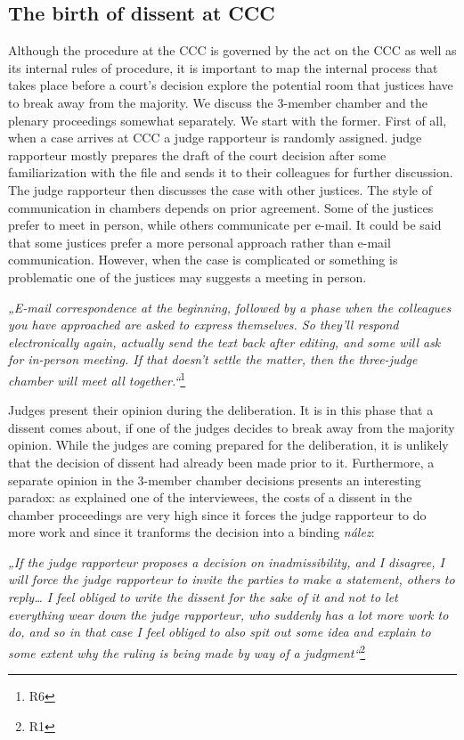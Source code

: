 \documentclass[
  11pt,
]{article}
\begin{document}
\subsection{The birth of dissent at CCC}\label{birth}

Although the procedure at the CCC is governed by the act on the CCC as well as its internal rules of procedure, it is important to map the internal process that takes place before a court's decision explore the potential room that justices have to break away from the majority. We discuss the 3-member chamber and the plenary proceedings somewhat separately. We start with the former. First of all, when a case arrives at CCC a judge rapporteur is randomly assigned. judge rapporteur mostly prepares the draft of the court decision after some familiarization with the file and sends it to their colleagues for further discussion. The judge rapporteur then discusses the case with other justices. The style of communication in chambers depends on prior agreement. Some of the justices prefer to meet in person, while others communicate per e-mail. It could be said that some justices prefer a more personal approach rather than e-mail communication. However, when the case is complicated or something is problematic one of the justices may suggests a meeting in person.

\emph{„E-mail correspondence at the beginning, followed by a phase when the colleagues you have approached are asked to express themselves. So they'll respond electronically again, actually send the text back after editing, and some will ask for in-person meeting. If that doesn't settle the matter, then the three-judge chamber will meet all together.``}\footnote{R6}

Judges present their opinion during the deliberation. It is in this phase that a dissent comes about, if one of the judges decides to break away from the majority opinion. While the judges are coming prepared for the deliberation, it is unlikely that the decision of dissent had already been made prior to it. Furthermore, a separate opinion in the 3-member chamber decisions presents an interesting paradox: as explained one of the interviewees, the costs of a dissent in the chamber proceedings are very high since it forces the judge rapporteur to do more work and since it tranforms the decision into a binding \emph{nález}:

\emph{„If the judge rapporteur proposes a decision on inadmissibility, and I disagree, I will force the judge rapporteur to invite the parties to make a statement, others to reply\ldots{} I feel obliged to write the dissent for the sake of it and not to let everything wear down the judge rapporteur, who suddenly has a lot more work to do, and so in that case I feel obliged to also spit out some idea and explain to some extent why the ruling is being made by way of a judgment``}\footnote{R1}
\end{document}
